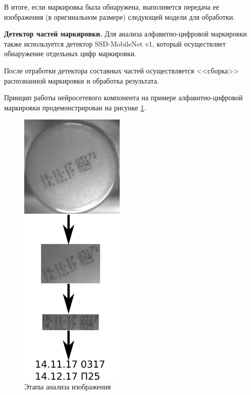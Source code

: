 В итоге, если маркировка была обнаружена, выполняется передача ее изображения (в оригинальном размере) следующей модели для обработки.


\textbf{Детектор частей маркировки.} Для анализа алфавитно-цифровой маркировки также используется детектор SSD-MobileNet v1, который осуществляет обнаружение отдельных цифр маркировки.

После отработки детектора составных частей осуществляется <<сборка>> распознанной маркировки и обработка результата.

Принцип работы нейросетевого компонента на примере алфавитно-цифровой маркировки продемонстрирован на рисунке \ref{fig:system_work}.

\begin{figure}[!ht]
	\centering
	\includegraphics[width=5cm]{man-source/images/ch4/pic4-5.png}
	\caption{Этапы анализа изображения}
	\label{fig:system_work}
\end{figure}

